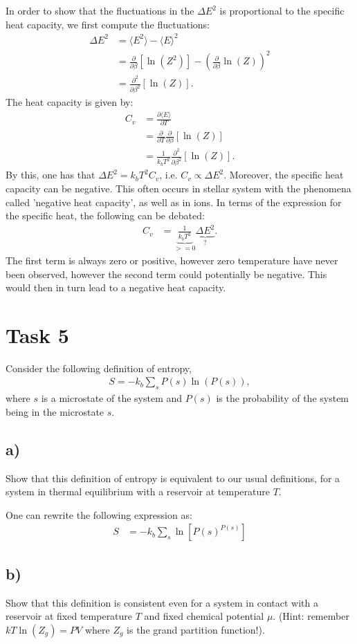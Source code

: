 \documentclass[a4paper]{article}
\newcommand{\average}[1]{\langle #1 \rangle}
\newcommand{\newparagraph}{\vspace{.5cm}\noindent}
\begin{document}
\newparagraph
In order to show that the fluctuations in the $\Delta E^2$ is proportional to the specific heat capacity, we first compute the fluctuations:
\begin{align*}
    \Delta E^2 &= \average{E^2} - \average{E}^2\\
    &= \frac{\partial}{\partial \beta}\left[\ln\left(Z^2\right)\right] - \left(\frac{\partial}{\partial \beta}\ln(Z)\right)^2\\
    &= \frac{\partial^2}{\partial \beta^2}\left[\ln(Z)\right].
\end{align*}The heat capacity is given by:
\begin{align*}
    C_v &= \frac{\partial \average{E}}{\partial T} \\
    &= \frac{\partial}{\partial T}\frac{\partial}{\partial \beta}\left[\ln(Z)\right]\\
    &=\frac{1}{k_b T^2}\frac{\partial^2}{\partial \beta^2}\left[\ln(Z)\right].
\end{align*}By this, one has that $\Delta E^2 = k_b T^2 C_v$, i.e. $C_v \propto \Delta E^2$. Moreover, the specific heat capacity can be negative. This often occurs in stellar system with the phenomena called 'negative heat capacity', as well as in ions.
In terms of the expression for the specific heat, the following can be debated:
\begin{align*}
    C_v &= \underbrace{\frac{1}{k_bT^2}}_{>= 0}\underbrace{\Delta E^2}_{?}.
\end{align*}The first term is always zero or positive, however zero temperature have never been observed, however the second term could potentially be negative. This would then in turn lead to a negative heat capacity.


\section*{Task 5}
Consider the following definition of entropy,
\begin{align*}
    S = -k_b\sum_s P(s)\ln(P(s)),
\end{align*}where $s$ is a microstate of the system and $P(s)$ is the probability of the system being in the microstate $s$.

\subsection*{a)}
Show that this definition of entropy is equivalent to our usual definitions, for a system in thermal equilibrium with a reservoir at temperature $T$.

\newparagraph
One can rewrite the following expression as:
\begin{align*}
    S &= -k_b\sum_s \ln\left[P(s)^{P(s)}\right]
\end{align*}

\subsection*{b)}
Show that this definition is consistent even for a system in contact with a reservoir at fixed temperature $T$ and fixed chemical potential $\mu$. (Hint: remember $kT\ln(Z_g)=PV$ where $Z_g$ is the grand partition function!).
\end{document}
